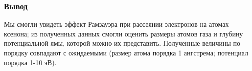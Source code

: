 \documentclass[11pt]{article}
\begin{document}
\subsubsection*{Вывод}
Мы смогли увидеть эффект Рамзауэра при рассеянии электронов на атомах ксенона; из полученных данных смогли оценить размеры атомов газа и глубину потенциальной ямы, которой можно их представить. Полученные величины по порядку совпадают с ожидаемыми (размер атома порядка 1 ангстрема; потенциал порядка 1-10 эВ).
\end{document}
